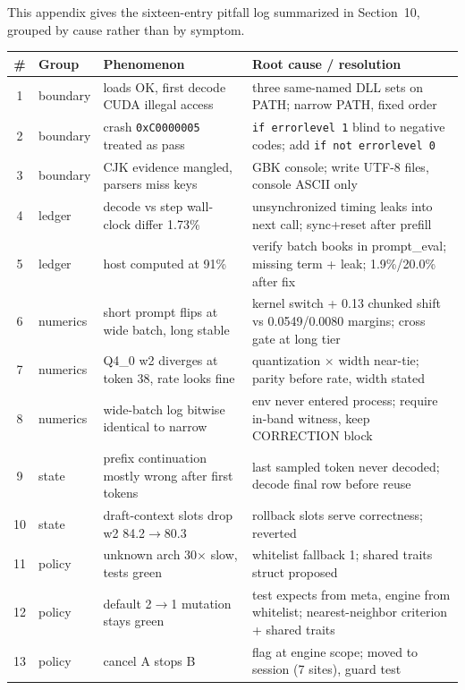 \documentclass[letterpaper,twocolumn,10pt]{article}
\begin{document}
This appendix gives the sixteen-entry pitfall log summarized in Section~10,
grouped by cause rather than by symptom.

\begin{table}[t]
\centering
\scriptsize
\setlength{\tabcolsep}{3pt}
\begin{tabular}{@{}clp{}p{}@{}}
\toprule
\# & Group & Phenomenon & Root cause / resolution \\
\midrule
1 & boundary & loads OK, first decode CUDA illegal access & three same-named DLL sets on PATH; narrow PATH, fixed order \\
2 & boundary & crash \texttt{0xC0000005} treated as pass & \texttt{if errorlevel 1} blind to negative codes; add \texttt{if not errorlevel 0} \\
3 & boundary & CJK evidence mangled, parsers miss keys & GBK console; write UTF-8 files, console ASCII only \\
4 & ledger & decode vs step wall-clock differ 1.73\% & unsynchronized timing leaks into next call; sync+reset after prefill \\
5 & ledger & host computed at 91\% & verify batch books in prompt\_eval; missing term + leak; 1.9\%/20.0\% after fix \\
6 & numerics & short prompt flips at wide batch, long stable & kernel switch + 0.13 chunked shift vs 0.0549/0.0080 margins; cross gate at long tier \\
7 & numerics & Q4\_0 w2 diverges at token 38, rate looks fine & quantization $\times$ width near-tie; parity before rate, width stated \\
8 & numerics & wide-batch log bitwise identical to narrow & env never entered process; require in-band witness, keep CORRECTION block \\
9 & state & prefix continuation mostly wrong after first tokens & last sampled token never decoded; decode final row before reuse \\
10 & state & draft-context slots drop w2 84.2$\rightarrow$80.3 & rollback slots serve correctness; reverted \\
11 & policy & unknown arch 30$\times$ slow, tests green & whitelist fallback 1; shared traits struct proposed \\
12 & policy & default 2$\rightarrow$1 mutation stays green & test expects from meta, engine from whitelist; nearest-neighbor criterion + shared traits \\
13 & policy & cancel A stops B & flag at engine scope; moved to session (7 sites), guard test \\

\end{tabular}
\end{table}
\end{document}
